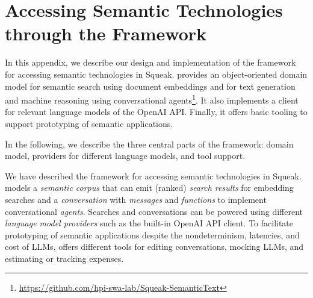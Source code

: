 
\chapter{Accessing Semantic Technologies through the \semtex Framework}
\label{apx:semtex}

In this appendix, we describe our design and implementation of the \semtex framework for accessing semantic technologies in Squeak.
\semtex provides an object-oriented domain model for semantic search using document embeddings and for text generation and machine reasoning using conversational agents\footnote{\url{https://github.com/hpi-swa-lab/Squeak-SemanticText}}.
It also implements a client for relevant language models of the OpenAI API.
Finally, it offers basic tooling to support prototyping of semantic applications.

In the following, we describe the three central parts of the framework: domain model, providers for different language models, and tool support.


\begin{summary}
	We have described the \semtex framework for accessing semantic technologies in Squeak.
	\semtex models a \emph{semantic corpus} that can emit (ranked) \emph{search results} for embedding searches and a \emph{conversation} with \emph{messages} and \emph{functions} to implement conversational \emph{agents}.
	Searches and conversations can be powered using different \emph{language model providers} such as the built-in OpenAI API client.
	To facilitate prototyping of semantic applications despite the nondeterminism, latencies, and cost of LLMs, \semtex offers different tools for editing conversations, mocking LLMs, and estimating or tracking expenses.
\end{summary}

